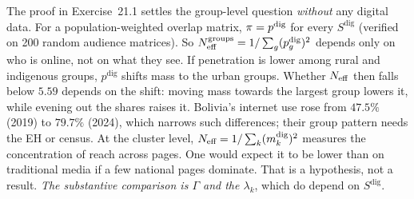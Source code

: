 \documentclass[../solutions_manual.tex]{subfiles}
\begin{document}
 The proof in Exercise~21.1 settles the group-level question \emph{without} any digital data. For a population-weighted overlap matrix, $\pi = p^{\text{dig}}$ for every $S^{\text{dig}}$ (verified on 200 random audience matrices). So $N_{\text{eff}}^{\text{groups}} = 1/\sum_g (p^{\text{dig}}_g)^2$ depends only on who is online, not on what they see. If penetration is lower among rural and indigenous groups, $p^{\text{dig}}$ shifts mass to the urban groups. Whether $N_{\text{eff}}$ then falls below $5.59$ depends on the shift: moving mass towards the largest group lowers it, while evening out the shares raises it. Bolivia's internet use rose from $47.5\%$ (2019) to $79.7\%$ (2024), which narrows such differences; their group pattern needs the EH or census. At the cluster level, $N_{\text{eff}} = 1/\sum_k (m_k^{\text{dig}})^2$ measures the concentration of reach across pages. One would expect it to be lower than on traditional media if a few national pages dominate. That is a hypothesis, not a result. \emph{The substantive comparison is $\Gamma$ and the $\lambda_k$}, which do depend on $S^{\text{dig}}$.

\end{document}
